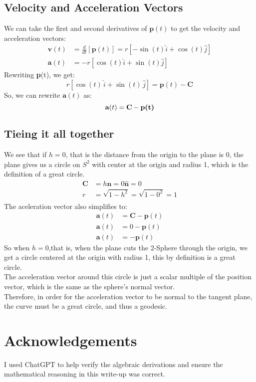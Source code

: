 \documentclass[11pt]{article}
\begin{document}
\subsection*{Velocity and Acceleration Vectors}
We can take the first and second derivatives of $\textbf{p}(t)$ to get the velocity and acceleration vectors:
\begin{align*}
    \mathbf{v}(t) & = \frac{d}{dt} \left[\textbf{p}(t)\right] =  r\left[-\sin(t) \hat{i} + \cos(t) \hat{j} \right] \\
    \mathbf{a}(t) & = -r[\cos(t)\hat{i} + \sin(t)\hat{j}]
\end{align*}
Rewriting \textbf{p}(t), we get:
$$r[\cos(t)\,\hat{i} + \sin(t)\,\hat{j}] = \textbf{p}(t) - \mathbf{C}$$
So, we can rewrite $\mathbf{a}(t)$ as:
$$\mathbf{a}(t) = \mathbf{C} - \textbf{\textbf{p}(t)}$$
\newpage
\subsection*{Tieing it all together}
We see that if $h = 0$, that is the distance from the origin to the plane is 0, the plane gives us a circle on $S^2$ with center at the origin and radius 1, which is the definition of a great circle.
\begin{align*}
    \mathbf{C} & = h \hat{\textbf{n}} = 0 \hat{\textbf{n}} = 0 \\[1ex]
    r          & = \sqrt{1- h^2} = \sqrt{1- 0^2} = 1           \\
\end{align*}
The aceleration vector also simplifies to:
\begin{align*}
    \mathbf{a}(t) & = \mathbf{C} - \textbf{p}(t) \\
    \mathbf{a}(t) & = 0 - \textbf{p}(t)          \\
    \mathbf{a}(t) & = - \textbf{p}(t)
\end{align*}
So when $h = 0$,that is, when the plane cuts the 2-Sphere through the origin, we get a circle centered at the origin with radius 1, this by definition is a great circle. \\
The acceleration vector around this circle is just a scalar multiple of the position vector, which is the same as the sphere's normal vector. \\
Therefore, in order for the acceleration vector to be normal to the tangent plane, the curve must be a great circle, and thus a geodesic.
\pagebreak
\section*{Acknowledgements}
I used ChatGPT to help verify the algebraic derivations and ensure the mathematical reasoning in this write-up was correct.
\end{document}
